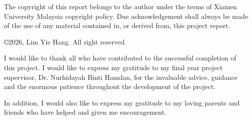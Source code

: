 \documentclass[12pt]{xmumthesis}
\newcommand{\studentname}{Lim Yie Hang}%
\newcommand{\supervisor}{Dr. Nurhidayah Binti Hamdan}%
\newcommand{\thesisyear}{2026}%
\begin{document}
\begin{romanpages}
\begin{approval}
\begin{tabular}{llp{9cm}}
\end{tabular}

\end{approval}




\begin{copyrightstatement}
The copyright of this report belongs to the author under the terms of Xiamen University Malaysia copyright policy. 
Due acknowledgement shall always be made of the use of any material contained in, or derived from, this project report.

\vspace{6ex} 

\begin{center}
\copyright \thesisyear, \studentname. All right reserved.
\end{center}
\end{copyrightstatement}




\begin{acknowledgements}

I would like to thank all who have contributed to the successful completion of this project. 
I would like to express my gratitude to my final year project supervisor, \supervisor, 
for the invaluable advice, guidance and the enormous patience throughout the development of the project.

In addition, I would also like to express my gratitude to my loving parents and friends who have helped and given me encouragement.

\end{acknowledgements}


\begin{abstract}
In statistical inference, the frequentist approach treats parameters as unknown fixed constants, whereas the Bayesian framework views them as random variables following a probability distribution. While Monte Carlo methods allow for the computational approximation of these distributions, traditional centralized Markov Chain Monte Carlo (MCMC) becomes computationally prohibitive when dealing with large-scale or distributed datasets.


\end{abstract}
\end{romanpages}
\end{document}
